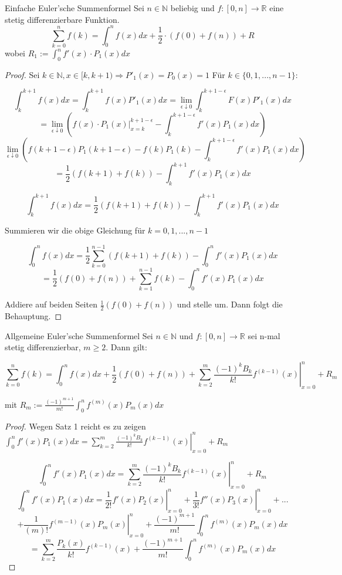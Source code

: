 \documentclass[12pt]{article}
\begin{document}
\begin{theorem}{Einfache Euler'sche Summenformel}
Sei \(n\in\mathbb{N}\) beliebig und \(f : [0, n] \to \mathbb{R}\) eine stetig differenzierbare Funktion.
\[\sum_{k=0}^n f(k) = \int_0^n f(x) dx + \frac{1}{2} \cdot (f(0) + f(n)) + R\]
wobei \(R_1 := \int_0^n f'(x) \cdot P_1(x) dx\)
\end{theorem}
\begin{proof}
Sei \(k \in \mathbb{N}, x \in [k, k+1) \Longrightarrow P'_1(x) = P_0(x) = 1\)
Für \(k \in \{ 0, 1, ..., n-1 \}\):

\[\int_k^{k+1} f(x) dx = \int_k^{k+1} f(x) P'_1(x) dx = \lim_{\epsilon \downarrow 0} \int_k^{k+1-\epsilon} F(x) P'_1(x) dx\]
\[= \lim_{\epsilon \downarrow 0} \left(\left. f(x) \cdot P_1(x) \right|_{x=k}^{k+1-\epsilon} - \int_k^{k+1-\epsilon} f'(x) P_1(x) dx \right) \] %
\[\lim_{\epsilon \downarrow 0} \left(f(k+1-\epsilon)P_1(k+1-\epsilon) -  f(k)P_1(k) - \int_k^{k+1-\epsilon} f'(x) P_1(x) dx \right)\]
\[ = \frac{1}{2}(f(k+1)+f(k)) - \int_k^{k+1} f'(x) P_1(x) dx\]

\[\int_k^{k+1} f(x) dx = \frac{1}{2}(f(k+1)+f(k)) - \int_k^{k+1} f'(x) P_1(x) dx\]

Summieren wir die obige Gleichung für \(k = 0, 1, ..., n-1\)

\[\int_0^n f(x) dx = \frac{1}{2} \sum_{k=0}^{n-1} \left(f(k+1) + f(k)\right) - \int_0^n f'(x) P_1(x) dx\]
\[= \frac{1}{2}(f(0) + f(n)) + \sum_{k=1}^{n-1} f(k) - \int_0^n f'(x) P_1(x) dx\]

Addiere auf beiden Seiten \(\frac{1}{2}(f(0) + f(n))\) und stelle um. Dann folgt die Behauptung.
\end{proof}

\begin{theorem}{Allgemeine Euler'sche Summenformel}
Sei \(n \in \mathbb{N}\) und \(f : [0, n] \to \mathbb{R}\) sei n-mal stetig differenzierbar, \(m \geq 2\). Dann gilt:

\[\sum_{k=0}^n f(k) = \int_0^n f(x) dx + \frac{1}{2}(f(0)+f(n)) + \sum_{k=2}^m \left. \frac{(-1)^k B_k}{k!} f^{(k-1)} (x) \right|_{x=0}^n + R_m\]

mit \(R_m := \frac{(-1)^{m+1}}{m!} \int_0^n f^{(m)}(x) P_m(x) dx\)
\end{theorem}
\begin{proof}
Wegen Satz 1 reicht es zu zeigen \(\int_0^n f'(x) P_1(x) dx = \sum_{k=2}^m \left. \frac{(-1)^k B_k}{k!} f^{(k-1)}(x) \right|_{x=0}^n + R_m\)

\[\int_0^n f'(x) P_1(x) dx = \sum_{k=2}^m \left. \frac{(-1)^k B_k}{k!} f^{(k-1)}(x) \right|_{x=0}^n + R_m\]
\[\int_0^n f'(x) P_1(x) dx = \left. \frac{1}{2!} f'(x) P_2(x) \right|_{x=0}^n + \left. \frac{1}{3!} f''(x) P_3(x) \right|_{x=0}^n + ...\]\[ + \left. \frac{1}{(m)!} f^{(m-1)}(x) P_{m}(x) \right|_{x=0}^n + \frac{(-1)^{m+1}}{m!} \int_0^n f^{(m)}(x) P_m(x) dx \]
\[ = \sum_{k=2}^m \frac{P_{k}(x)}{k!} f^{(k-1)}(x) + \frac{(-1)^{m+1}}{m!} \int_0^n f^{(m)}(x) P_m(x) dx \]
\end{proof}
\end{document}
